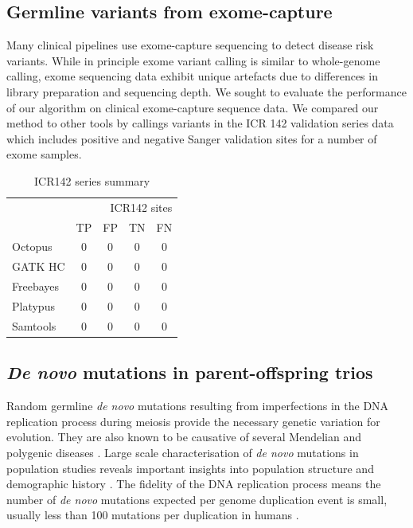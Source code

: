 \documentclass[notitlepage, twocolumn]{article}
\begin{document}
\subsection*{Germline variants from exome-capture}

Many clinical pipelines use exome-capture sequencing to detect disease risk variants. While in principle exome variant calling is similar to whole-genome calling, exome sequencing data exhibit unique artefacts due to differences in library preparation and sequencing depth. We sought to evaluate the performance of our algorithm on clinical exome-capture sequence data. We compared our method to other tools by callings variants in the ICR 142 validation series data \cite{RN154} which includes positive and negative Sanger validation sites for a number of exome samples.

\begin{table}[ht]
\centering
\caption{ICR142 series summary}
\begin{tabular}{lcccc}
\hline
\multicolumn{5}{r}{ICR142 sites} \\
\cline{2-5} & TP & FP & TN & FN \\
\hline
Octopus & 0 & 0 & 0 & 0 \\
GATK HC & 0 & 0 & 0 & 0 \\
Freebayes & 0 & 0 & 0 & 0 \\
Platypus & 0 & 0 & 0 & 0 \\
Samtools & 0 & 0 & 0 & 0 \\
\hline
\end{tabular}
\end{table}

\subsection*{\textit{De novo} mutations in parent-offspring trios}

Random germline \textit{de novo} mutations resulting from imperfections in the DNA replication process during meiosis provide the necessary genetic variation for evolution. They are also known to be causative of several Mendelian and polygenic diseases \cite{RN157, RN160, RN159}. Large scale characterisation of \textit{de novo} mutations in population studies reveals important insights into population structure and demographic history \cite{RN158}. The fidelity of the DNA replication process means the number of \textit{de novo} mutations expected per genome duplication event is small, usually less than 100 mutations per duplication in humans \cite{RN6}.
\end{document}
